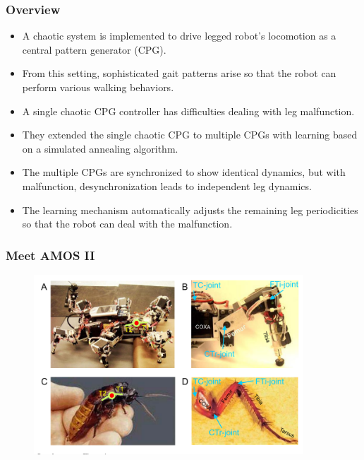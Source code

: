 \documentclass{beamer}
\begin{document}
\begin{frame}
\frametitle{Overview}
\begin{itemize}
\item A chaotic system is implemented to drive legged robot's locomotion as a central pattern generator (CPG).
\item From this setting, sophisticated gait patterns arise so that the robot can perform various walking behaviors.
\item A single chaotic CPG controller has difficulties dealing with leg malfunction.
\item They extended the single chaotic CPG to multiple CPGs with learning based on a simulated annealing algorithm.
\item The multiple CPGs are synchronized to show identical dynamics, but with malfunction, desynchronization leads to independent leg dynamics.
\item The learning mechanism automatically adjusts the remaining leg periodicities so that the robot can deal with the malfunction.
\end{itemize}
\end{frame}

\begin{frame}
\frametitle{Meet AMOS II}
\begin{figure}
\center
\includegraphics[width=0.9\textwidth]{figs/AMOSII-cockroach.pdf}
\end{figure}
\end{frame}
\end{document}
